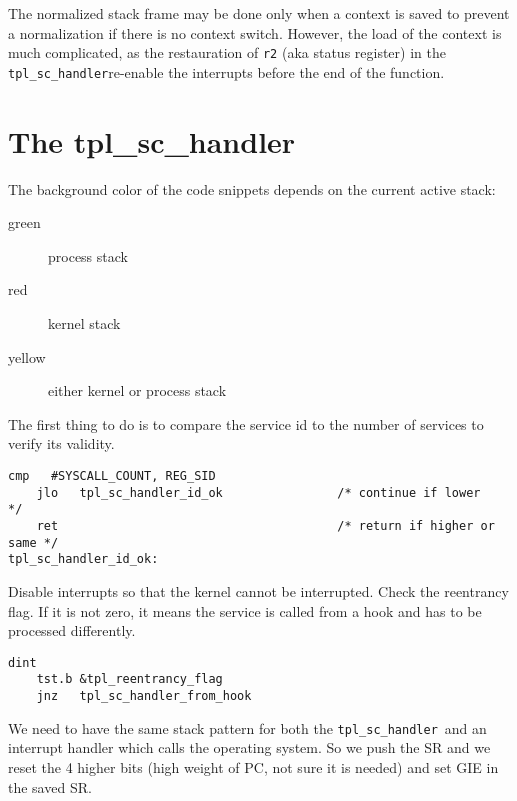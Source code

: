 \documentclass[11pt, oneside]{article}   	%
\newcommand{\sch}{\lstinline{tpl_sc_handler}}
\begin{document}
The normalized stack frame may be done only when a context is saved to prevent a normalization if there is no context switch. However, the load of the context is much complicated, as the restauration of \texttt{r2} (aka status register) in the \sch re-enable the interrupts before the end of the function.

\section{The tpl\_sc\_handler}

The background color of the code snippets depends on the current active stack:
\begin{description}
	\item[green] process stack
	\item[red]   kernel stack
	\item[yellow] either kernel or process stack
\end{description}


\vspace{1em}

The first thing to do is to compare the service id to the number of services to verify its validity.

\begin{lstlisting}[backgroundcolor=\color{yellow!15}]
    cmp   #SYSCALL_COUNT, REG_SID
    jlo   tpl_sc_handler_id_ok                /* continue if lower        */
    ret                                       /* return if higher or same */
tpl_sc_handler_id_ok:
\end{lstlisting}

Disable interrupts so that the kernel cannot be interrupted. Check the reentrancy flag. If it is not zero, it means the service is called from a hook and has to be processed differently.

\begin{lstlisting}[backgroundcolor=\color{yellow!15}]
    dint
    tst.b &tpl_reentrancy_flag
    jnz   tpl_sc_handler_from_hook
\end{lstlisting}


We need to have the same stack pattern for both the \sch\ and an interrupt handler which calls the operating system. So we push the SR
 and we reset the 4 higher bits (high weight of PC, not sure it is needed)
 and set GIE in the saved SR.
\end{document}
